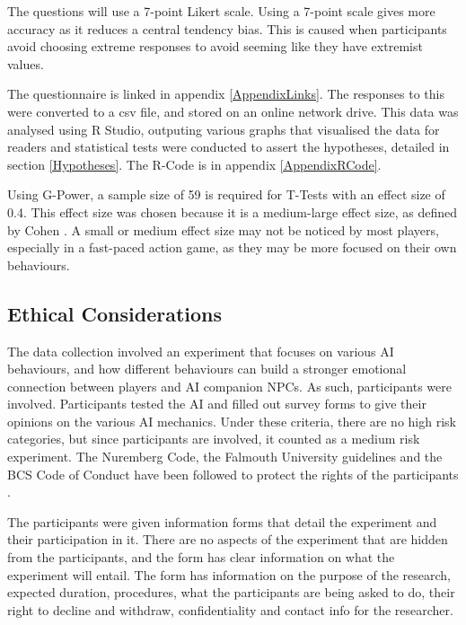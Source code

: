 \documentclass{IEEEtran}
\begin{document}

The questions will use a 7-point Likert scale. Using a 7-point scale gives more accuracy as it reduces a central tendency bias. This is caused when participants avoid choosing extreme responses to avoid seeming like they have extremist values.

The questionnaire is linked in appendix \ref{AppendixLinks}. The responses to this were converted to a csv file, and stored on an online network drive. This data was analysed using R Studio, outputing various graphs that visualised the data for readers and statistical tests were conducted to assert the hypotheses, detailed in section \ref{Hypotheses}. The R-Code is in appendix \ref{AppendixRCode}.

Using G-Power, a sample size of 59 is required for T-Tests with an effect size of 0.4. This effect size was chosen because it is a medium-large effect size, as defined by Cohen \cite{cohen1988statistical}. A small or medium effect size may not be noticed by most players, especially in a fast-paced action game, as they may be more focused on their own behaviours.


\subsection{Ethical Considerations}
\label{EthicalConsiderations}

The data collection involved an experiment that focuses on various AI behaviours, and how different behaviours can build a stronger emotional connection between players and AI companion NPCs. As such, participants were involved. Participants tested the AI and filled out survey forms to give their opinions on the various AI mechanics. Under these criteria, there are no high risk categories, but since participants are involved, it counted as a medium risk experiment. The Nuremberg Code, the Falmouth University guidelines and the BCS Code of Conduct have been followed to protect the rights of the participants \cite{germany1949trials, BCSConductCode}.

The participants were given information forms that detail the experiment and their participation in it. There are no aspects of the experiment that are hidden from the participants, and the form has clear information on what the experiment will entail. The form has information on the purpose of the research, expected duration, procedures, what the participants are being asked to do, their right to decline and withdraw, confidentiality and contact info for the researcher.
\end{document}
